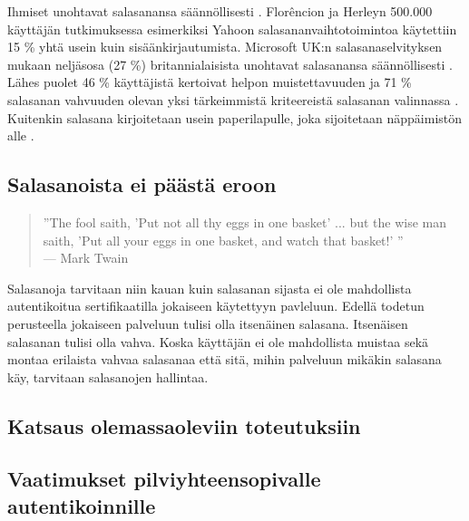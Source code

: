 \documentclass{tktltiki}
\begin{document}
Ihmiset unohtavat salasanansa säännöllisesti \cite{ponemon_pw_survey_06}. Florêncion ja Herleyn 500.000 käyttäjän tutkimuksessa \cite{study_of_passwords_07} esimerkiksi Yahoon salasananvaihtotoimintoa käytettiin 15 \% yhtä usein kuin sisäänkirjautumista. Microsoft UK:n salasanaselvityksen mukaan neljäsosa (27 \%) britannialaisista unohtavat salasanansa säännöllisesti \cite{microsoft_pw_survey_04}. Lähes puolet 46 \% käyttäjistä kertoivat helpon muistettavuuden ja 71 \% salasanan vahvuuden olevan yksi tärkeimmistä kriteereistä salasanan valinnassa \cite{symantec_pw_survey_10}. Kuitenkin salasana kirjoitetaan usein paperilapulle, joka sijoitetaan näppäimistön alle \cite{pw_auth_system_perspective_08}.



\subsection{Salasanoista ei päästä eroon}

  \begin{quote}
      ''The fool saith, 'Put not all thy eggs in one basket' ... 
      but the wise man saith, 'Put all your eggs in one basket, and watch that basket!' ''
      \\--- Mark Twain \cite{twain_eggs_1894}
  \end {quote}

Salasanoja tarvitaan niin kauan kuin salasanan sijasta ei ole mahdollista autentikoitua sertifikaatilla jokaiseen käytettyyn pavleluun. Edellä todetun perusteella jokaiseen palveluun tulisi olla itsenäinen salasana. Itsenäisen salasanan tulisi olla vahva. Koska käyttäjän ei ole mahdollista muistaa sekä montaa erilaista vahvaa salasanaa että sitä, mihin palveluun mikäkin salasana käy, tarvitaan salasanojen hallintaa.


   
   
\subsection{Katsaus olemassaoleviin toteutuksiin}
\subsection{Vaatimukset pilviyhteensopivalle autentikoinnille}
\end{document}
